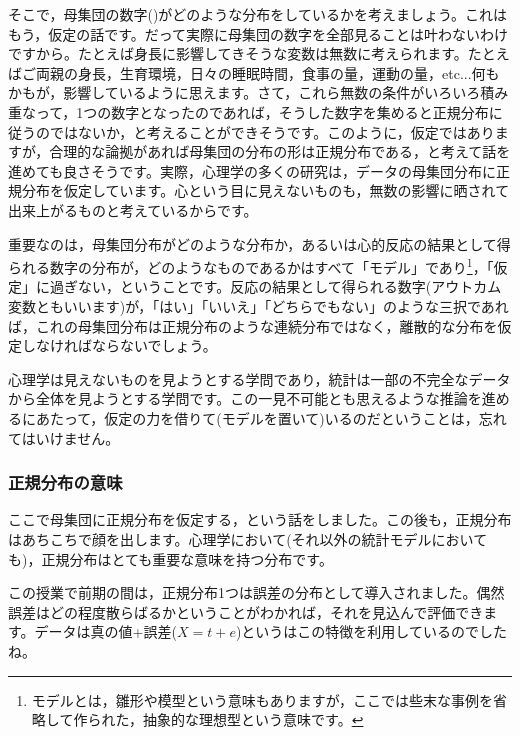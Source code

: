 \documentclass{ltjsbook}
\begin{document}

そこで，母集団の数字()がどのような分布をしているかを考えましょう。これはもう，仮定の話です。だって実際に母集団の数字を全部見ることは叶わないわけですから。たとえば身長に影響してきそうな変数は無数に考えられます。たとえばご両親の身長，生育環境，日々の睡眠時間，食事の量，運動の量，etc...何もかもが，影響しているように思えます。さて，これら無数の条件がいろいろ積み重なって，1つの数字となったのであれば，そうした数字を集めると正規分布に従うのではないか，と考えることができそうです。このように，仮定ではありますが，合理的な論拠があれば母集団の分布の形は正規分布である，と考えて話を進めても良さそうです。実際，心理学の多くの研究は，データの母集団分布に正規分布を仮定しています。心という目に見えないものも，無数の影響に晒されて出来上がるものと考えているからです。

重要なのは，母集団分布がどのような分布か，あるいは心的反応の結果として得られる数字の分布が，どのようなものであるかはすべて「モデル」であり\footnote{モデルとは，雛形や模型という意味もありますが，ここでは些末な事例を省略して作られた，抽象的な理想型という意味です。}，「仮定」に過ぎない，ということです。反応の結果として得られる数字(アウトカム変数ともいいます)が，「はい」「いいえ」「どちらでもない」のような三択であれば，これの母集団分布は正規分布のような連続分布ではなく，離散的な分布を仮定しなければならないでしょう。

心理学は見えないものを見ようとする学問であり，統計は一部の不完全なデータから全体を見ようとする学問です。この一見不可能とも思えるような推論を進めるにあたって，仮定の力を借りて(モデルを置いて)いるのだということは，忘れてはいけません。

\subsubsection{正規分布の意味}
\label{SevenNormalDistributions}
ここで母集団に正規分布を仮定する，という話をしました。この後も，正規分布はあちこちで顔を出します。心理学において(それ以外の統計モデルにおいても)，正規分布はとても重要な意味を持つ分布です。

この授業で前期の間は，正規分布1つは誤差の分布として導入されました。偶然誤差はどの程度散らばるかということがわかれば，それを見込んで評価できます。データは真の値+誤差($X=t+e$)というはこの特徴を利用しているのでしたね。
\end{document}
